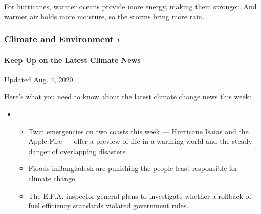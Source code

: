 For hurricanes, warmer oceans provide more energy, making them stronger.
And warmer air holds more moisture, so
\href{https://www.nytimes.com/2019/07/11/climate/hurricane-tropical-storms.html}{the
storms bring more rain}.

\href{https://www.nytimes.com/section/climate?action=click\&pgtype=Article\&state=default\&region=MAIN_CONTENT_1\&context=storylines_keepup}{}

\hypertarget{climate-and-environment-}{%
\subsubsection{Climate and Environment
›}\label{climate-and-environment-}}

\hypertarget{keep-up-on-the-latest-climate-news}{%
\paragraph{Keep Up on the Latest Climate
News}\label{keep-up-on-the-latest-climate-news}}

Updated Aug. 4, 2020

Here's what you need to know about the latest climate change news this
week:

\begin{itemize}
\item
  \begin{itemize}
  \tightlist
  \item
    \href{https://www.nytimes.com/2020/08/04/climate/hurricane-isaias-apple-fire-climate.html?action=click\&pgtype=Article\&state=default\&region=MAIN_CONTENT_1\&context=storylines_keepup}{Twin
    emergencies on two coasts this week} --- Hurricane Isaias and the
    Apple Fire --- offer a preview of life in a warming world and the
    steady danger of overlapping disasters.
  \item
    \href{https://www.nytimes.com/2020/07/30/climate/bangladesh-floods.html?action=click\&pgtype=Article\&state=default\&region=MAIN_CONTENT_1\&context=storylines_keepup}{Floods
    in}\href{https://www.nytimes.com/2020/07/30/climate/bangladesh-floods.html?action=click\&pgtype=Article\&state=default\&region=MAIN_CONTENT_1\&context=storylines_keepup}{Bangladesh}
    are punishing the people least responsible for climate change.
  \item
    The E.P.A. inspector general plans to investigate whether a rollback
    of fuel efficiency standards
    \href{https://www.nytimes.com/2020/07/27/climate/trump-fuel-efficiency-rule.html?action=click\&pgtype=Article\&state=default\&region=MAIN_CONTENT_1\&context=storylines_keepup}{violated
    government rules}.
  \end{itemize}
\end{itemize}

